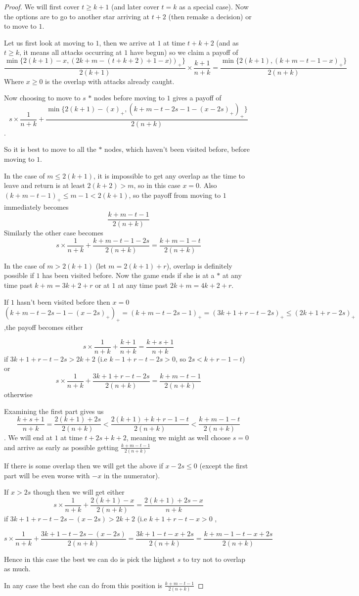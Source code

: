 \documentclass[a4paper,10pt]{article}
\newcommand{\pospart}[1]{\left( #1 \right)_{+}}
\theoremstyle{definition}
\theoremstyle{definition}
\theoremstyle{remark}
\theoremstyle{definition}
\begin{document}
\begin{proof}
We will first cover $t \geq k+1$ (and later cover $t=k$ as a special case). Now the options are to go to another star arriving at $t+2$ (then remake a decision) or to move to $1$.

Let us first look at moving to $1$, then we arrive at $1$ at time $t+k+2$ (and as $t \geq k$, it means all attacks occurring at $1$ have begun) so we claim a payoff of
$$\frac{\min\{2(k+1)-x,\pospart{2k+m-(t+k+2)+1-x)}\}}{2(k+1)} \times \frac{k+1}{n+k}=\frac{\min\{2(k+1),\pospart{k+m-t-1-x}\}}{2(n+k)}$$
Where $x \geq 0$ is the overlap with attacks already caught.

Now choosing to move to $s$ $*$ nodes before moving to $1$ gives a payoff of
$$s \times \frac{1}{n+k} + \frac{\min \{2(k+1)-\pospart{x},\pospart{k+m-t-2s-1-\pospart{x-2s}} \}}{2(n+k)}$$.

So it is best to move to all the $*$ nodes, which haven't been visited before, before moving to $1$.

In the case of $m \leq 2(k+1)$, it is impossible to get any overlap as the time to leave and return is at least $2(k+2) > m$, so in this case $x=0$. Also $\pospart{k+m-t-1} \leq m-1 < 2(k+1)$, so the payoff from moving to $1$ immediately becomes
$$\frac{k+m-t-1}{2(n+k)}$$
Similarly the other case becomes
$$s \times \frac{1}{n+k} + \frac{k+m-t-1-2s}{2(n+k)}=\frac{k+m-1-t}{2(n+k)}$$

In the case of $m > 2(k+1)$ (let $m=2(k+1)+r$), overlap is definitely possible if $1$ has been visited before. Now the game ends if she is at a $*$ at any time past $k+m = 3k+2+r$ or at $1$ at any time past $2k+m = 4k+2+r$.

If $1$ hasn't been visited before then $x=0$ $\pospart{k+m-t-2s-1-\pospart{x-2s}}=\pospart{k+m-t-2s-1}=\pospart{3k+1+r-t-2s} \leq \pospart{2k+1+r-2s}$,the payoff becomes either

$$s \times \frac{1}{n+k} +\frac{k+1}{n+k}=\frac{k+s+1}{n+k}$$ if $3k+1+r-t-2s > 2k+2$ (i.e $k-1+r-t-2s > 0$, so $2s<k+r-1-t$)
or
$$s \times \frac{1}{n+k} +\frac{3k+1+r-t-2s}{2(n+k)}=\frac{k+m-t-1}{2(n+k)}$$ otherwise

Examining the first part gives us
$$\frac{k+s+1}{n+k}=\frac{2(k+1)+2s}{2(n+k)} < \frac{2(k+1)+k+r-1-t}{2(n+k)}< \frac{k+m-1-t}{2(n+k)}$$.
We will end at $1$ at time $t+2s+k+2$, meaning we might as well choose $s=0$ and arrive as early as possible getting $\frac{k+m-t-1}{2(n+k)}$

If there is some overlap then we will get the above if $x-2s \leq 0$ (except the first part will be even worse with $-x$ in the numerator).

If $x > 2s$ though then we will get either
$$s \times \frac{1}{n+k} + \frac{2(k+1)-x}{2(n+k)}=\frac{2(k+1)+2s-x}{n+k}$$ if $3k+1+r-t-2s-(x-2s) > 2k+2$ (i.e $k+1+r-t-x > 0$ ,

$$s \times \frac{1}{n+k} + \frac{3k+1-t-2s-(x-2s)}{2(n+k)}=\frac{3k+1-t-x+2s}{2(n+k)}=\frac{k+m-1-t-x+2s}{2(n+k)} $$

Hence in this case the best we can do is pick the highest $s$ to try not to overlap as much.

In any case the best she can do from this position is $\frac{k+m-t-1}{2(n+k)}$
\end{proof}
\end{document}
